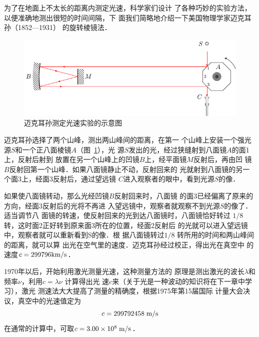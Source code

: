 为了在地面上不太长的距离内测定光速，科学家们设计
了各种巧妙的实验方法，以便准确地测出很短的时间间隔，下
面我们简略地介绍一下美国物理学家迈克耳孙（1852—1931）
的旋转棱镜法．
\begin{figure}[htbp]
    \centering
    \includegraphics{fig/C/5-5.pdf}
    \caption{迈克耳孙测定光速实验的示意图}\label{fig_C_5-5}
\end{figure}

迈克耳孙选择了两个山峰，测出两山峰间的距离，在第一
个山峰上安装一个强光源$S$和一个正八面棱镜$A$（图~\ref{fig_C_5-5}），光
源$S$发出的光，经过狭缝射到八面镜$A$的面1上，反射后射到
放置在另一个山峰上的凹镜$B$上，经平面镜$M$反射后，再由凹
镜$B$反射回第一个山峰．如果八面镜静止不动，反射回来的
光就射到八面镜的另一个面3上，经面3反射后，通过望远镜
$C$进入观察者的眼中，看到光源$S$的像．

如果使八面镜转动，那么光经凹镜$B$反射回来时，八面镜
的面3已经偏离了原来的方向，经面3反射后的光将不再进
入望远镜中，观察者就观察不到光源$S$的像了．适当调节八
面镜的转速，使反射回来的光到达八面镜时，八面镜恰好转过
$1/8$转，这时面2正好转到原来面3所在的位置，经面2反射后
的光就可以进入望远镜中，观察者就可以重新看到S的像．根
据八面镜转过$1/8$
转所用的时间和两山峰间的距离，就可以算
出光在空气里的速度．迈克耳孙经过校正，得出光在真空中
的速度$c=299796{\rm km}/{\rm s}$．

1970年以后，开始利用激光测量光速，这种测量方法的
原理是测出激光的波长$\lambda$和频率$\nu$，利用$c=\lambda\nu$ 计算得出光
速$c$来（关于光是一种波动的知识将在下一章中学习），激光
测速法大大提高了测量的精确度，根据1975年第15届国际
计量大会决议，真空中的光速值定为
$$c=299792458\;\text{m}/\text{s}$$
在通常的计算中，可取$c=3.00\times10^8\;\text{m}/\text{s}$．

